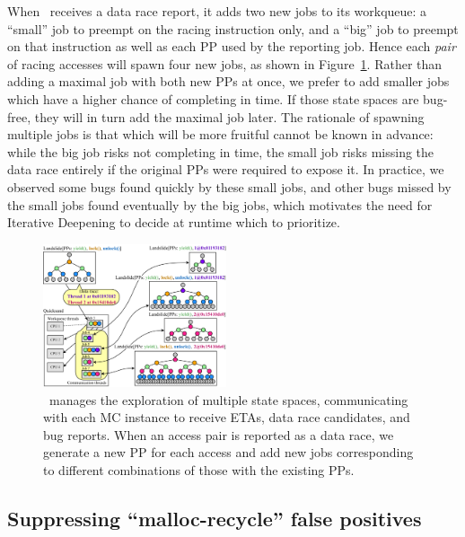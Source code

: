 When \quicksand~receives a data race report, it adds two new jobs to its workqueue:
a ``small'' job to preempt on the racing instruction only,
and a ``big'' job to preempt on that instruction as well as each PP used by the reporting job.
%
Hence each {\em pair} of racing accesses will spawn four new jobs, as shown in Figure~\ref{fig:new-dr-jobs}.
Rather than adding a maximal job with both new PPs at once, we prefer to add smaller jobs which have a higher chance of completing in time.
If those state spaces are bug-free, they will in turn add the maximal job later.
%
The rationale of spawning multiple jobs is that which will be more fruitful cannot be known in advance:
while the big job risks not completing in time,
the small job risks missing the data race entirely if the original PPs were required to expose it.
In practice, we observed some bugs found quickly by these small jobs, and other bugs missed by the small jobs found eventually by the big jobs,
which motivates the need for Iterative Deepening to decide at runtime which to prioritize.

\begin{figure}[t]
	\includegraphics[width=0.48\textwidth]{dr-jobs.pdf}
	\caption{\quicksand~manages the exploration of multiple state spaces, communicating with each MC instance to receive ETAs, data race candidates, and bug reports.
		When an access pair is reported as a data race, we generate a new PP for each access and add new jobs corresponding to different combinations of those with the existing PPs.}
	\label{fig:new-dr-jobs}
\end{figure}

\subsection{Suppressing ``malloc-recycle'' false positives}
\label{sec:recycle}


